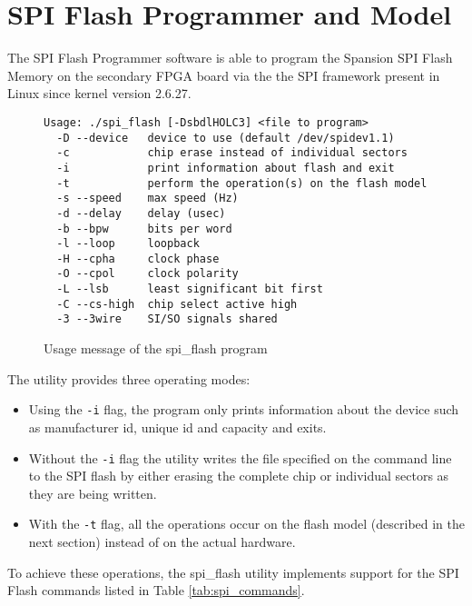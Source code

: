 

\newpage
\section{SPI Flash Programmer and Model}
The SPI Flash Programmer software is able to program the Spansion SPI Flash Memory
on the secondary FPGA board via the the SPI framework present in Linux 
since kernel version 2.6.27.

\begin{figure}[h!]
\lstset{basicstyle=\scriptsize\ttfamily}
\begin{lstlisting}
Usage: ./spi_flash [-DsbdlHOLC3] <file to program>
  -D --device   device to use (default /dev/spidev1.1)
  -c            chip erase instead of individual sectors
  -i            print information about flash and exit
  -t            perform the operation(s) on the flash model
  -s --speed    max speed (Hz)
  -d --delay    delay (usec)
  -b --bpw      bits per word 
  -l --loop     loopback
  -H --cpha     clock phase
  -O --cpol     clock polarity
  -L --lsb      least significant bit first
  -C --cs-high  chip select active high
  -3 --3wire    SI/SO signals shared
\end{lstlisting}
\caption{Usage message of the spi\_flash program}
\end{figure}

The utility provides three operating modes:

\begin{itemize}
 \item Using the \texttt{-i} flag, the program only prints information about the device such as manufacturer id, unique id and capacity and exits.
 \item Without the \texttt{-i} flag the utility writes the file specified on the command line to the SPI flash by either erasing the complete chip or individual sectors as they are being written.
 \item With the \texttt{-t} flag, all the operations occur on the flash model (described in the next section) instead of on the actual hardware.
\end{itemize}

To achieve these operations, the spi\_flash utility implements support for the SPI Flash commands listed in Table \ref{tab:spi_commands}.

